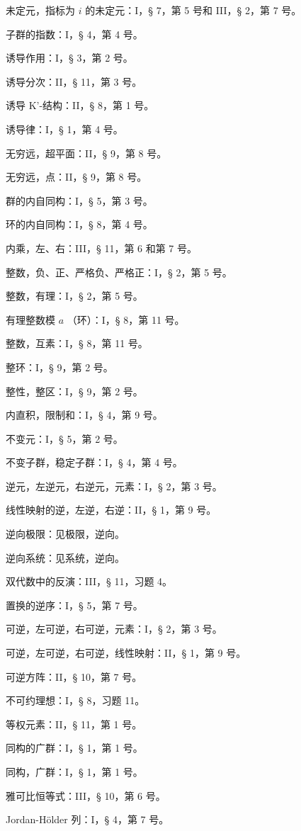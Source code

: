 未定元，指标为 \(i\) 的未定元：I，§ 7，第 5 号和 III，§ 2，第 7 号。

子群的指数：I，§ 4，第 4 号。

诱导作用：I，§ 3，第 2 号。

诱导分次：II，§ 11，第 3 号。

诱导 K'-结构：II，§ 8，第 1 号。

诱导律：I，§ 1，第 4 号。

无穷远，超平面：II，§ 9，第 8 号。

无穷远，点：II，§ 9，第 8 号。

群的内自同构：I，§ 5，第 3 号。

环的内自同构：I，§ 8，第 4 号。

内乘，左、右：III，§ 11，第 6 和第 7 号。

整数，负、正、严格负、严格正：I，§ 2，第 5 号。

整数，有理：I，§ 2，第 5 号。

有理整数模 \(a\) （环）：I，§ 8，第 11 号。

整数，互素：I，§ 8，第 11 号。

整环：I，§ 9，第 2 号。

整性，整区：I，§ 9，第 2 号。

内直积，限制和：I，§ 4，第 9 号。

不变元：I，§ 5，第 2 号。

不变子群，稳定子群：I，§ 4，第 4 号。

逆元，左逆元，右逆元，元素：I，§ 2，第 3 号。

线性映射的逆，左逆，右逆：II，§ 1，第 9 号。

逆向极限：见极限，逆向。

逆向系统：见系统，逆向。

双代数中的反演：III，§ 11，习题 4。

置换的逆序：I，§ 5，第 7 号。

可逆，左可逆，右可逆，元素：I，§ 2，第 3 号。

可逆，左可逆，右可逆，线性映射：II，§ 1，第 9 号。

可逆方阵：II，§ 10，第 7 号。

不可约理想：I，§ 8，习题 11。

等权元素：II，§ 11，第 1 号。

同构的广群：I，§ 1，第 1 号。

同构，广群：I，§ 1，第 1 号。

雅可比恒等式：III，§ 10，第 6 号。

Jordan-Hölder 列：I，§ 4，第 7 号。

